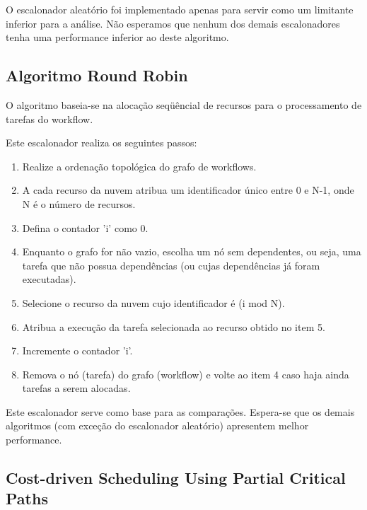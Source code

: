 \documentclass[a4paper,10pt]{article}
\begin{document}
O escalonador aleatório foi implementado apenas para servir como um limitante inferior para a análise.
Não esperamos que nenhum dos demais escalonadores tenha uma performance inferior ao deste algoritmo.

\subsection{Algoritmo Round Robin}

O algoritmo baseia-se na alocação seqüêncial de recursos para o processamento de tarefas do workflow.

Este escalonador realiza os seguintes passos:

\begin{enumerate}

    \item Realize a ordenação topológica do grafo de workflows.

    \item A cada recurso da nuvem atribua um identificador único entre 0 e N-1, onde N é o número de recursos.

    \item Defina o contador 'i' como 0.

    \item Enquanto o grafo for não vazio, escolha um nó sem dependentes, ou seja, uma tarefa que não possua dependências 
(ou cujas dependências já foram executadas).

    \item Selecione o recurso da nuvem cujo identificador é (i mod N).

    \item Atribua a execução da tarefa selecionada ao recurso obtido no item 5.

    \item Incremente o contador 'i'.

    \item Remova o nó (tarefa) do grafo (workflow) e volte ao item 4 caso haja ainda tarefas a serem alocadas.

\end{enumerate}

Este escalonador serve como base para as comparações. Espera-se que os demais algoritmos (com exceção do escalonador
aleatório) apresentem melhor performance.

\subsection{Cost-driven Scheduling Using Partial Critical Paths}
\end{document}

